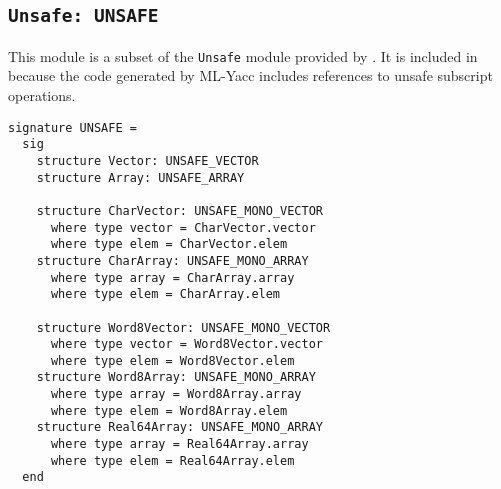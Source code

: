 \subsection{{\tt Unsafe: UNSAFE}}

This module is a subset of the {\tt Unsafe} module provided by
{\smlnj}.  It is included in {\mlton} because the code generated by
ML-Yacc includes references to unsafe subscript operations.

\begin{verbatim}
signature UNSAFE =
  sig
    structure Vector: UNSAFE_VECTOR
    structure Array: UNSAFE_ARRAY

    structure CharVector: UNSAFE_MONO_VECTOR
      where type vector = CharVector.vector
      where type elem = CharVector.elem
    structure CharArray: UNSAFE_MONO_ARRAY
      where type array = CharArray.array
      where type elem = CharArray.elem

    structure Word8Vector: UNSAFE_MONO_VECTOR
      where type vector = Word8Vector.vector
      where type elem = Word8Vector.elem
    structure Word8Array: UNSAFE_MONO_ARRAY
      where type array = Word8Array.array
      where type elem = Word8Array.elem
    structure Real64Array: UNSAFE_MONO_ARRAY
      where type array = Real64Array.array
      where type elem = Real64Array.elem
  end
\end{verbatim}
